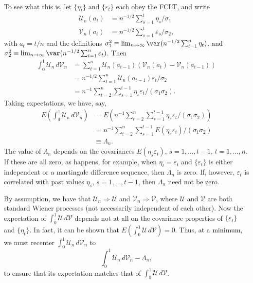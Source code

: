 To see what this is, let $\{\eta_t\}$ and $\{\varepsilon_t\}$ each obey the FCLT, and write
\begin{align*}
\mathcal{U}_n(a_t) &= n^{-1/2}\sum_{s=1}^{t} \eta_s / \sigma_1 \\
\mathcal{V}_n(a_t) &= n^{-1/2}\sum_{s=1}^{t} \varepsilon_s / \sigma_2,
\end{align*}
with $a_t = t/n$ and the definitions $\sigma_1^2 \equiv \lim_{n\to\infty} \var(n^{-1/2}\sum_{t=1}^{n} \eta_t)$, and $\sigma_2^2 \equiv \lim_{n\to\infty} \var(n^{-1/2}\sum_{t=1}^{n} \varepsilon_t)$. Then
\begin{align*}
\int_0^1 \mathcal{U}_n\,d\mathcal{V}_n &= \sum_{t=1}^{n} \mathcal{U}_n(a_{t-1})(\mathcal{V}_n(a_t) - \mathcal{V}_n(a_{t-1})) \\
&= n^{-1/2}\sum_{t=1}^{n} \mathcal{U}_n(a_{t-1})\varepsilon_t / \sigma_2 \\
&= n^{-1}\sum_{t=2}^{n} \sum_{s=1}^{t-1} \eta_s \varepsilon_t / (\sigma_1 \sigma_2).
\end{align*}
Taking expectations, we have, say,
\begin{align*}
E\!\left(\int_0^1 \mathcal{U}_n\,d\mathcal{V}_n\right) &= E\!\left(n^{-1}\sum_{t=2}^{n}\sum_{s=1}^{t-1} \eta_s \varepsilon_t / (\sigma_1 \sigma_2)\right) \\
&= n^{-1}\sum_{t=2}^{n}\sum_{s=1}^{t-1} E(\eta_s \varepsilon_t)/(\sigma_1 \sigma_2) \\
&\equiv \Lambda_n.
\end{align*}
The value of $\Lambda_n$ depends on the covariances $E(\eta_s \varepsilon_t)$, $s = 1, \ldots, t-1$, $t = 1, \ldots, n$. If these are all zero, as happens, for example, when $\eta_t = \varepsilon_t$ and $\{\varepsilon_t\}$ is either independent or a martingale difference sequence, then $\Lambda_n$ is zero. If, however, $\varepsilon_t$ is correlated with past values $\eta_s$, $s = 1, \ldots, t-1$, then $\Lambda_n$ need not be zero.

By assumption, we have that $\mathcal{U}_n \Rightarrow \mathcal{U}$ and $\mathcal{V}_n \Rightarrow \mathcal{V}$, where $\mathcal{U}$ and $\mathcal{V}$ are both standard Wiener processes (not necessarily independent of each other). Now the expectation of $\int_0^1 \mathcal{U}\,d\mathcal{V}$ depends not at all on the covariance properties of $\{\varepsilon_t\}$ and $\{\eta_t\}$. In fact, it can be shown that $E(\int_0^1 \mathcal{U}\,d\mathcal{V}) = 0$. Thus, at a minimum, we must recenter $\int_0^1 \mathcal{U}_n\,d\mathcal{V}_n$ to
\[
\int_0^1 \mathcal{U}_n\,d\mathcal{V}_n - \Lambda_n,
\]
to ensure that its expectation matches that of $\int_0^1 \mathcal{U}\,d\mathcal{V}$.

